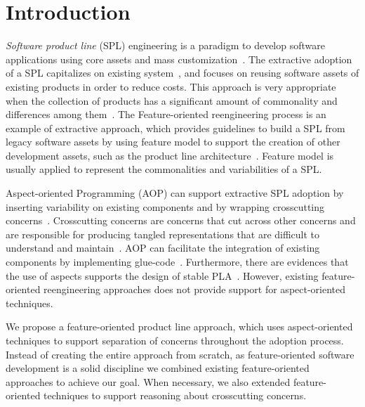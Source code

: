 \documentclass[11pt,twoside]{article}
\begin{document}
\newpage

\begin{abstract} 
  
\end{abstract}



\section{Introduction}

\textit{Software product line} (SPL) engineering is a paradigm to develop software applications using core assets and mass
customization~\cite{Pohl:2005:SPL}. The extractive
adoption of a SPL capitalizes on existing system~\cite{Lee:2009:ERU}, and focuses on reusing software assets of existing products in order to reduce
costs. This approach is very
appropriate when the collection of products has a significant amount of commonality and differences among them~\cite{Krueger:2002:ETS}. The
Feature-oriented reengineering process
is an example of extractive approach, which provides guidelines to build a SPL from legacy software assets by using feature model to support the
creation of other development
assets, such as the product line architecture~\cite{Kang:2006:FOR}. Feature model is usually applied to represent the commonalities and variabilities
of a SPL. 

Aspect-oriented Programming (AOP) can support extractive SPL adoption by inserting variability on existing components and by wrapping crosscutting
concerns~\cite{Truyen:2000:ART}.
Crosscutting concerns are concerns that cut across other concerns and are responsible for producing tangled representations that are difficult to
understand and
maintain~\cite{Rashid:2003:MCA}. AOP can facilitate the integration of existing components by implementing glue-code~\cite{Kvale:2005:CSB}.
Furthermore, there are evidences that the use of aspects supports the design of stable PLA~\cite{Figueiredo:2008:ESP,
Tizzei:2011:ECSA,Tizzei:2011:CMA}. However, existing
feature-oriented reengineering approaches does not provide support for aspect-oriented techniques.

We propose a feature-oriented product line approach, which uses aspect-oriented techniques to support separation of concerns throughout the adoption
process. Instead of creating
the entire approach from scratch, as feature-oriented software development is a solid discipline we combined existing feature-oriented approaches to
achieve our goal. When
necessary, we also extended feature-oriented techniques to support reasoning about crosscutting concerns. 
\end{document}
